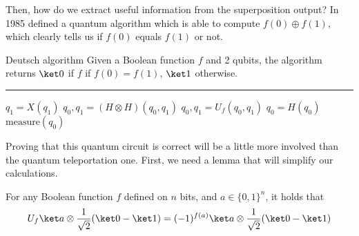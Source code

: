 \documentclass[a4paper, 12pt]{report}
\begin{document}
Then, how do we extract useful  information from the superposition output? In 1985 \textcite{deutsch} defined a quantum algorithm which is able to compute $f(0) \oplus f(1)$, which clearly tells us if $f(0)$ equals $f(1)$ or not.

\begin{framedalgo}{Deutsch algorithm}
    Given a Boolean function $f$ and 2 qubits, the algorithm returns $\ket 0$ if $f$ if $f(0) = f(1)$, $\ket 1$ otherwise. \\
    \hrule

    \quad
    \begin{algorithmic}[1]
            \State $q_1 = X(q_1)$
            \State $q_0, q_1 = (H \otimes H)(q_0, q_1)$
            \State $q_0, q_1 = U_f(q_0, q_1)$
            \State $q_0 = H(q_0)$
            \State {} $\mbox{measure}(q_0)$
        \EndFunction
    \end{algorithmic}
\end{framedalgo}


Proving that this quantum circuit is correct will be a little more involved than the quantum teleportation one. First, we need a lemma that will simplify our calculations.

\begin{framedlem}[label={U lemma}]{}
    For any Boolean function $f$ defined on $n$ bits, and $a \in \{0, 1\}^n$, it holds that $$U_f \ket a \otimes \dfrac{1}{\sqrt 2}(\ket 0 - \ket 1) = (-1)^{f(a)} \ket a \otimes \dfrac{1}{\sqrt 2}(\ket 0 - \ket 1)$$
\end{framedlem}
\end{document}
